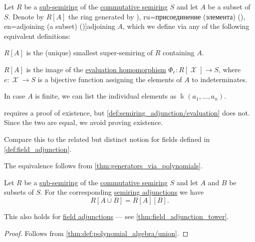 \begin{definition}\label{def:semiring_adjunction}
  Let \( R \) be a \hyperref[def:ring/submodel]{sub-semiring} of the \hyperref[def:semiring/commutative]{commutative semiring} \( S \) and let \( A \) be a subset of \( S \). Denote by \( R[A] \) the ring generated by \term[bg=присъединяване/адюнгиране (на елемент) (\cite[425]{Обрешков1962ВисшаАлгебра}), ru=присоединение (элемента) (\cite[288]{Курош1968КурсВысшейАлгебры}), en=adjoining (a subset) (\cite[119]{Jacobson1985BasicAlgebraI})]{adjoining} \( A \), which we define via any of the following equivalent definitions:
  \begin{thmenum}
     \( R[A] \) is the (unique) smallest super-semiring of \( R \) containing \( A \).

     \( R[A] \) is the image of the \hyperref[con:evaluation_homomorphism]{evaluation homomorphism} \( \Phi_e: R[\mscrX] \to S \), where \( e: \mscrX \to S \) is a bijective function assigning the elements of \( A \) to indeterminates.
  \end{thmenum}

  In case \( A \) is finite, we can list the individual elements as \( \Bbbk(a_1, \ldots, a_n) \).
\end{definition}
\begin{comments}
  \item {} requires a proof of existence, but \cref{def:semiring_adjunction/evaluation} does not. Since the two are equal, we avoid proving existence.
  \item Compare this to the related but distinct notion for fields defined in \cref{def:field_adjunction}.
\end{comments}
\begin{defproof}
  The equivalence follows from \cref{thm:generators_via_polynomials}.
\end{defproof}

\begin{proposition}\label{thm:semiring_adjunction_tower}
  Let \( R \) be a \hyperref[def:ring/submodel]{sub-semiring} of the \hyperref[def:semiring/commutative]{commutative semiring} \( S \) and let \( A \) and \( B \) be subsets of \( S \). For the corresponding \hyperref[def:semiring_adjunction]{semiring adjunctions} we have
  \begin{equation*}
    R[A \cup B] = R[A][B].
  \end{equation*}
\end{proposition}
\begin{comments}
  \item This also holds for \hyperref[def:field_adjunction]{field adjunctions} --- see \cref{thm:field_adjunction_tower}.
\end{comments}
\begin{proof}
  Follows from \cref{thm:def:polynomial_algebra/union}.
\end{proof}

